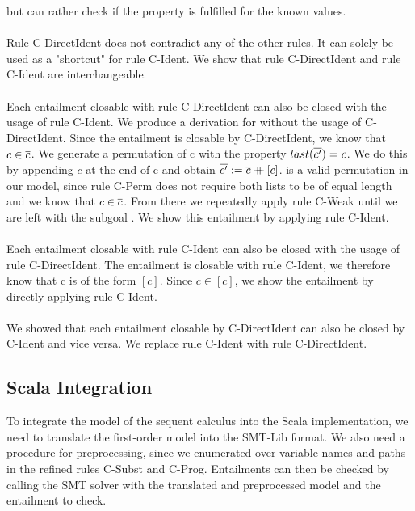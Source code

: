 but can rather check if the property is fulfilled
for the known values.\\
\\
Rule C-DirectIdent does not contradict any of the other rules.
It can solely be used as a "shortcut" for rule C-Ident.
We show that rule C-DirectIdent and rule C-Ident are interchangeable.\\
\\
Each entailment  closable with rule C-DirectIdent
can also be closed with the usage of rule C-Ident.
We produce a derivation for 
without the usage of C-DirectIdent.
Since the entailment is closable by C-DirectIdent,
we know that $c \in \overline{c}$.
We generate a permutation  of \ovl c
with the property $last(\overline{c'}) = c$.
We do this by appending $c$ at the end of \ovl c
and obtain $\overline{c'} := \overline{c} \mathbin{+\mkern-10mu+} [c]$.
 is a valid permutation in our model,
since rule C-Perm does not require
both lists to be of equal length and
we know that $c \in \overline{c}$.
From there we repeatedly apply rule C-Weak
until we are left with the subgoal .
We show this entailment by applying rule C-Ident.\\
\\
Each entailment  closable with rule C-Ident
can also be closed with the usage of rule C-DirectIdent.
The entailment is closable with rule C-Ident,
we therefore know that \ovl c is of the form $[c]$.
Since $c \in [c]$, we show the entailment 
by directly applying rule C-Ident.\\
\\
We showed that each entailment closable by C-DirectIdent
can also be closed by C-Ident and vice versa.
We replace rule C-Ident with rule C-DirectIdent.

\subsection{Scala Integration}
To integrate the model of the sequent calculus
into the Scala implementation, we need to translate the
first-order model into the SMT-Lib format.
We also need a procedure for preprocessing,
since we enumerated over variable names and paths
in the refined rules C-Subst and C-Prog.
Entailments can then be checked by calling the SMT solver
with the translated and preprocessed model
and the entailment to check.

